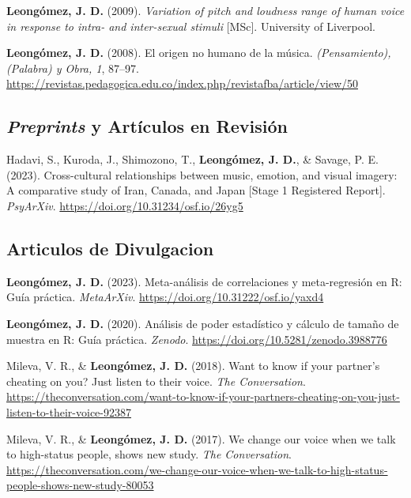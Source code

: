\documentclass[11pt,a4paper,]{awesome-cv}
\begin{document}
\textbf{Leongómez, J. D.} (2009). \emph{Variation of pitch and loudness
range of human voice in response to intra- and inter-sexual stimuli}
{[}MSc{]}. University of Liverpool.

\textbf{Leongómez, J. D.} (2008). El origen no humano de la música.
\emph{(Pensamiento), (Palabra) y Obra, 1}, 87--97.
\url{https://revistas.pedagogica.edu.co/index.php/revistafba/article/view/50}

\endgroup

\hypertarget{section-1}{%
\subsection{\texorpdfstring{\textbf{\textit{Preprints} y Artículos en Revisión}}{}}\label{section-1}}

\begingroup
\footnotesize
\setlength{\parindent}{-0.5in}
\setlength{\leftskip}{0.5in}

Hadavi, S., Kuroda, J., Shimozono, T., \textbf{Leongómez, J. D.}, \&
Savage, P. E. (2023). Cross-cultural relationships between music,
emotion, and visual imagery: A comparative study of Iran, Canada, and
Japan {[}Stage 1 Registered Report{]}. \emph{PsyArXiv}.
\url{https://doi.org/10.31234/osf.io/26yg5}

\endgroup

\hypertarget{section-2}{%
\subsection{\texorpdfstring{\textbf{Articulos de Divulgacion}}{}}\label{section-2}}

\begingroup
\footnotesize
\setlength{\parindent}{-0.5in}
\setlength{\leftskip}{0.5in}

\textbf{Leongómez, J. D.} (2023). Meta-análisis de correlaciones y
meta-regresión en R: Guía práctica. \emph{MetaArXiv}.
\url{https://doi.org/10.31222/osf.io/yaxd4}

\textbf{Leongómez, J. D.} (2020). Análisis de poder estadístico y
cálculo de tamaño de muestra en R: Guía práctica. \emph{Zenodo}.
\url{https://doi.org/10.5281/zenodo.3988776}

Mileva, V. R., \& \textbf{Leongómez, J. D.} (2018). Want to know if your
partner's cheating on you? Just listen to their voice. \emph{The
Conversation}.
\url{https://theconversation.com/want-to-know-if-your-partners-cheating-on-you-just-listen-to-their-voice-92387}

Mileva, V. R., \& \textbf{Leongómez, J. D.} (2017). We change our voice
when we talk to high-status people, shows new study. \emph{The
Conversation}.
\url{https://theconversation.com/we-change-our-voice-when-we-talk-to-high-status-people-shows-new-study-80053}
\end{document}
